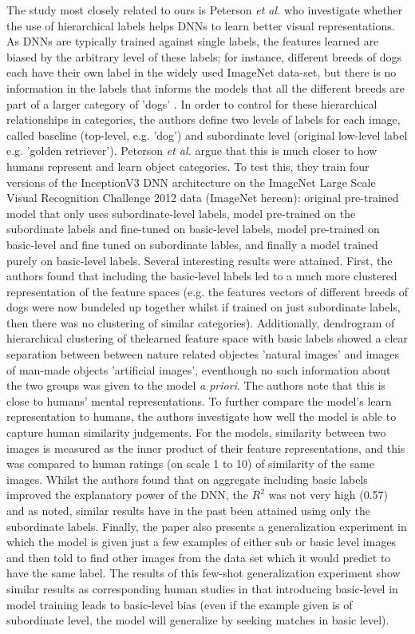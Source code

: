 \documentclass{report}
\begin{document}
The study most closely related to ours is Peterson \textit{et al.} \cite{Peterson2018} who investigate whether the use of hierarchical labels helps DNNs to learn better visual representations. As DNNs are typically trained against single labels, the features learned are biased by the arbitrary level of these labels; for instance, different breeds of dogs each have their own label in the widely used ImageNet data-set, but there is no information in the labels that informs the models that all the different breeds are part of a larger category of 'dogs' \cite{Peterson2018}. In order to control for these hierarchical relationships in categories, the authors define two levels of labels for each image, called baseline (top-level, e.g. 'dog') and subordinate level (original low-level label e.g. 'golden retriever'). Peterson \textit{et al.} argue that this is much closer to how humans represent and learn object categories. To test this, they train four versions of the InceptionV3 \cite{inception} DNN architecture on the ImageNet Large Scale Visual Recognition Challenge 2012 data (ImageNet hereon): original pre-trained model that only uses subordinate-level labels, model pre-trained on the subordinate labels and fine-tuned on basic-level labels, model pre-trained on basic-level and fine tuned on subordinate lables, and finally a model trained purely on basic-level labels. Several interesting results were attained. First, the authors found that including the basic-level labels led to a much more clustered representation of the feature spaces (e.g. the features vectors of different breeds of dogs were now bundeled up together whilst if trained on just subordinate labels, then there was no clustering of similar categories). Additionally, dendrogram of hierarchical clustering of thelearned feature space with basic labels showed a clear separation between between nature related objectes 'natural images' and images of man-made objects 'artificial images', eventhough no such information about the two groups was given to the model \textit{a priori}. The authors note that this is close to humans' mental representations. To further compare the model's learn representation to humans, the authors investigate how well the model is able to capture human similarity judgements. For the models, similarity between two images is measured as the inner product of their feature representations, and this was compared to human ratings (on scale 1 to 10) of similarity of the same images. Whilst the authors found that on aggregate including basic labels improved the explanatory power of the DNN, the $R^2$ was not very high (0.57) and as noted, similar results have in the past been attained using only the subordinate labels. Finally, the paper also presents a generalization experiment in which the model is given just a few examples of either sub or basic level images and then told to find other images from the data set which it would predict to have the same label. The results of this few-shot generalization experiment show similar results as corresponding human studies \cite{XuTennenbaum} in that introducing basic-level in model training leads to basic-level bias (even if the example given is of subordinate level, the model will generalize by seeking matches in basic level).\\ \\
\end{document}
